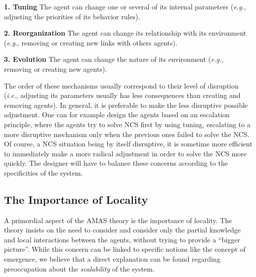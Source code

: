 \begin{compactitem}
\item\textbf{1. Tuning} The agent can change one or several of its internal parameters (\textit{e.g.}, adjusting the priorities of its behavior rules).
\item\textbf{2. Reorganization} The agent can change its relationship with its environment (\textit{e.g.}, removing or creating new links with others agents).
\item\textbf{3. Evolution} The agent can change the nature of its environment (\textit{e.g.}, removing or creating new agents).
\end{compactitem}

The order of these mechanisms usually correspond to their level of disruption (\textit{i.e.}, adjusting its parameters usually has less consequences than creating and removing agents). In general, it is preferable to make the less disruptive possible adjustment. One can for example design the agents based on an escalation principle, where the agents try to solve NCS first by using tuning, escalating to a more disruptive mechanism only when the previous ones failed to solve the NCS. Of course, a NCS situation being by itself disruptive, it is sometime more efficient to immediately make a more radical adjustment in order to solve the NCS more quickly. The designer will have to balance these concerns according to the specificities of the system.

\subsection{The Importance of Locality}

A primordial aspect of the AMAS theory is the importance of locality. The theory insists on the need to consider and consider only the partial knowledge and local interactions between the agents, without trying to provide a \enquote{bigger picture}. While this concern can be linked to specific notions like the concept of emergence, we believe that a direct explanation can be found regarding preoccupation about the \emph{scalability} of the system.

